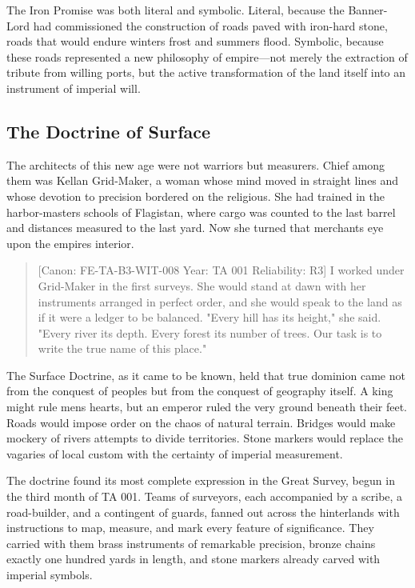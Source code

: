 The Iron Promise was both literal and symbolic. Literal, because the
Banner-Lord had commissioned the construction of roads paved with
iron-hard stone, roads that would endure winter\textquotesingle s frost
and summer\textquotesingle s flood. Symbolic, because these roads
represented a new philosophy of empire---not merely the extraction of
tribute from willing ports, but the active transformation of the land
itself into an instrument of imperial will.

\subsection{The Doctrine of Surface}\label{the-doctrine-of-surface}

The architects of this new age were not warriors but measurers. Chief
among them was Kellan Grid-Maker, a woman whose mind moved in straight
lines and whose devotion to precision bordered on the religious. She had
trained in the harbor-master\textquotesingle s schools of Flagistan,
where cargo was counted to the last barrel and distances measured to the
last yard. Now she turned that merchant\textquotesingle s eye upon the
empire\textquotesingle s interior.

\begin{quote}
{[}Canon: FE-TA-B3-WIT-008 \textbar{} Year: TA 001 \textbar{}
Reliability: R3{]} I worked under Grid-Maker in the first surveys. She
would stand at dawn with her instruments arranged in perfect order, and
she would speak to the land as if it were a ledger to be balanced.
"Every hill has its height," she said. "Every river its depth. Every
forest its number of trees. Our task is to write the true name of this
place."
\end{quote}

The Surface Doctrine, as it came to be known, held that true dominion
came not from the conquest of peoples but from the conquest of geography
itself. A king might rule men\textquotesingle s hearts, but an emperor
ruled the very ground beneath their feet. Roads would impose order on
the chaos of natural terrain. Bridges would make mockery of
rivers\textquotesingle{} attempts to divide territories. Stone markers
would replace the vagaries of local custom with the certainty of
imperial measurement.

The doctrine found its most complete expression in the Great Survey,
begun in the third month of TA 001. Teams of surveyors, each accompanied
by a scribe, a road-builder, and a contingent of guards, fanned out
across the hinterlands with instructions to map, measure, and mark every
feature of significance. They carried with them brass instruments of
remarkable precision, bronze chains exactly one hundred yards in length,
and stone markers already carved with imperial symbols.

